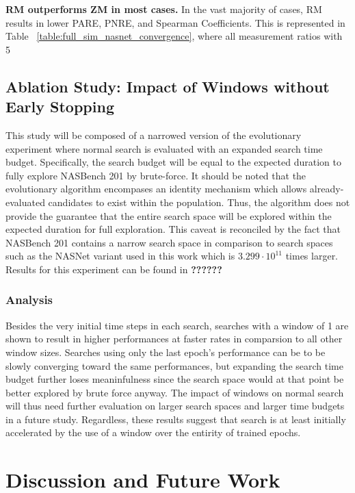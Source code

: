 \documentclass[twocolumn]{article}
\begin{document}
\textbf{RM outperforms ZM in most cases.}
In the vast majority of cases, RM results in lower PARE, PNRE, and Spearman Coefficients.
This is represented in Table ~\ref{table:full_sim_nasnet_convergence}, where all measurement ratios with 5%

\subsection{Ablation Study: Impact of Windows without Early Stopping}

This study will be composed of a narrowed version of the evolutionary experiment where normal search is evaluated with an expanded search time budget.
Specifically, the search budget will be equal to the expected duration to fully explore NASBench 201 by brute-force. 
It should be noted that the evolutionary algorithm encompases an identity mechanism which allows already-evaluated candidates to exist within the population.
Thus, the algorithm does not provide the guarantee that the entire search space will be explored within the expected duration for full exploration.
This caveat is reconciled by the fact that NASBench 201 contains a narrow search space in comparison to search spaces such as the NASNet variant used in this work
which is $3.299\cdot10^{11}$ times larger. Results for this experiment can be found in \textbf{??????}

\subsubsection{Analysis}

Besides the very initial time steps in each search, searches with a window of 1 are shown to result in higher performances at faster rates in comparsion to all other
window sizes. 
Searches using only the last epoch's performance can be to be slowly converging toward the same performances, but expanding the search time budget further loses
meaninfulness since the search space would at that point be better explored by brute force anyway.
The impact of windows on normal search will thus need further evaluation on larger search spaces and larger time budgets in a future study.
Regardless, these results suggest that search is at least initially accelerated by the use of a window over the entirity of trained epochs.

\section{Discussion and Future Work}
\end{document}
